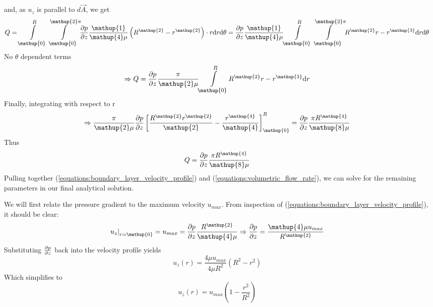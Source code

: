 and, as \(u_z\) is parallel to \(d\vec{A}\), we get
\begin{equation}
    Q = \mathlarger{\int\limits_{\mathup{0}}^{R}\int\limits_{\mathup{0}}^{\mathup{2}\pi}}\pdv{p}{z}\frac{\mathup{1}}{\mathup{4}\mu}\left( R^\mathup{2} - r^\mathup{2}\right) \cdot r \mathrm{d}r\mathrm{d}\theta = \pdv{p}{z}\frac{\mathup{1}}{\mathup{4}\mu}\mathlarger{\int\limits_{\mathup{0}}^{R}\int\limits_{\mathup{0}}^{\mathup{2}\pi}} R^\mathup{2}r - r^\mathup{3} \mathrm{d}r\mathrm{d}\theta
\end{equation}
No \(\theta\) dependent terms
\begin{equation}
    \Rightarrow Q = \pdv{p}{z}\frac{\pi}{\mathup{2}\mu}\mathlarger{\int\limits_{\mathup{0}}^{R}}R^\mathup{2}r - r^\mathup{3} \mathrm{d}r
\end{equation}
Finally, integrating with respect to r
\begin{equation}
    \Rightarrow \frac{\pi}{\mathup{2}\mu}\pdv{p}{z}\left[\frac{R^\mathup{2}r^\mathup{2}}{\mathup{2}} - \frac{r^\mathup{4}}{\mathup{4}}\right]_{\mathup{0}}^{R} = \pdv{p}{z}\frac{\pi R^\mathup{4}}{\mathup{8}\mu}
\end{equation}
Thus
\begin{equation}
\label{equations:volumetric_flow_rate}
    Q = \pdv{p}{z}\frac{\pi R^\mathup{4}}{\mathup{8}\mu}
\end{equation}
Pulling together (\ref{equations:boundary_layer_velocity_profile}) and (\ref{equations:volumetric_flow_rate}), we can solve for the remaining parameters in our final analytical solution.

We will first relate the pressure gradient to the maximum velocity \(u_{max}\). From inspection of (\ref{equations:boundary_layer_velocity_profile}), it should be clear:
\begin{equation}
\label{equations:pressure_gradient}
    \left\zerodel u_z \right|_{r = \mathup{0}} = u_{max} =\pdv{p}{z}\frac{R^\mathup{2}}{\mathup{4}\mu} \Rightarrow \pdv{p}{z} = \frac{\mathup{4}\mu u_{max}}{R^\mathup{2}}
\end{equation}
Substituting \(\frac{\partial p}{\partial z}\) back into the velocity profile yields
\begin{equation}
    u_z(r) = \frac{\mathup{4}\mu u_{max}}{\mathup{4}\mu R^\mathup{2}}\left(R^\mathup{2} - r^\mathup{2}\right)
\end{equation}
Which simplifies to
\begin{equation}
\label{equations:velocity_function_of_umax}
    u_z(r) = u_{max}\left(\mathup{1} - \frac{r^\mathup{2}}{R^\mathup{2}}\right)
\end{equation}

